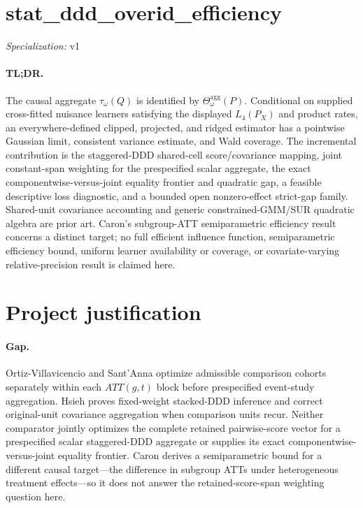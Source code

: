 \documentclass{article}
\begin{document}
\sloppy

\section*{stat\_\allowbreak{}ddd\_\allowbreak{}overid\_\allowbreak{}efficiency}

\noindent\textit{Specialization:} v1\par

\paragraph{TL;DR.} The causal aggregate \(\tau_\omega(Q)\) is identified by \(\Theta_\omega^{\mathrm{agg}}(P)\). Conditional on supplied cross-fitted nuisance learners satisfying the displayed \(L_4(P_X)\) and product rates, an everywhere-defined clipped, projected, and ridged estimator has a pointwise Gaussian limit, consistent variance estimate, and Wald coverage. The incremental contribution is the staggered-DDD shared-cell score/covariance mapping, joint constant-span weighting for the prespecified scalar aggregate, the exact componentwise-versus-joint equality frontier and quadratic gap, a feasible descriptive loss diagnostic, and a bounded open nonzero-effect strict-gap family. Shared-unit covariance accounting and generic constrained-GMM/SUR quadratic algebra are prior art. Caron's subgroup-ATT semiparametric efficiency result concerns a distinct target; no full efficient influence function, semiparametric efficiency bound, uniform learner availability or coverage, or covariate-varying relative-precision result is claimed here.

\section{Project justification}

\paragraph{Gap.} Ortiz-Villavicencio and Sant'Anna optimize admissible comparison cohorts separately within each \(ATT(g,t)\) block before prespecified event-study aggregation. Hsieh proves fixed-weight stacked-DDD inference and correct original-unit covariance aggregation when comparison units recur. Neither comparator jointly optimizes the complete retained pairwise-score vector for a prespecified scalar staggered-DDD aggregate or supplies its exact componentwise-versus-joint equality frontier. Caron derives a semiparametric bound for a different causal target—the difference in subgroup ATTs under heterogeneous treatment effects—so it does not answer the retained-score-span weighting question here.
\end{document}
